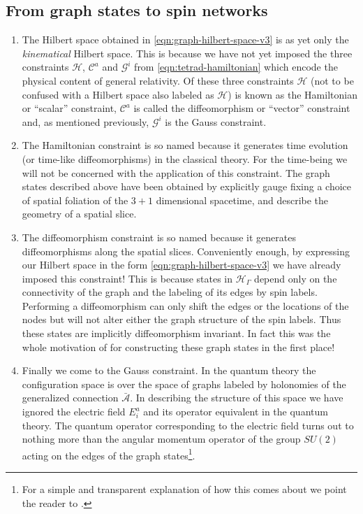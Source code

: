\documentclass[preprint]{SciPost}
\newcommand{\mc}[1]{\mathcal{#1}}
\theoremstyle{plain} %
\begin{document}
\subsection*{From graph states to spin networks}
	\begin{enumerate}[label=\arabic*.]
		\item The Hilbert space obtained in \eqref{eqn:graph-hilbert-space-v3} is as yet only the \emph{kinematical} Hilbert space. This is because we have not yet imposed the three constraints $ \mc{H} $, $ \mc{C}^a $ and $ \mc{G}^i $ from \eqref{eqn:tetrad-hamiltonian} which encode the physical content of general relativity. Of these three constraints $ \mc{H} $ (not to be confused with a Hilbert space also labeled as $ \mc{H} $) is known as the Hamiltonian or ``scalar'' constraint, $ \mc{C}^a $ is called the diffeomorphism or ``vector'' constraint and, as mentioned previously, $ \mc{G}^i $ is the Gauss constraint.
		\item The Hamiltonian constraint is so named because it generates time evolution (or time-like diffeomorphisms) in the classical theory. For the time-being we will not be concerned with the application of this constraint. The graph states described above have been obtained by explicitly gauge fixing a choice of spatial foliation of the $ 3+1 $ dimensional spacetime, and describe the geometry of a spatial slice.
		\item The diffeomorphism constraint is so named because it generates diffeomorphisms along the spatial slices. Conveniently enough, by expressing our Hilbert space in the form \eqref{eqn:graph-hilbert-space-v3} we have already imposed this constraint! This is because states in $ \mc{H}_\Gamma $ depend only on the connectivity of the graph and the labeling of its edges by spin labels. Performing a diffeomorphism can only shift the edges or the locations of the nodes but will not alter either the graph structure of the spin labels. Thus these states are implicitly diffeomorphism invariant. In fact this was the whole motivation of \cite{Ashtekar1994A-Manifestly} for constructing these graph states in the first place!
		\item Finally we come to the Gauss constraint. In the quantum theory the configuration space is over the space of graphs labeled by holonomies of the generalized connection $ \bar{\mc{A}} $. In describing the structure of this space we have ignored the electric field $ E^a_i $ and its operator equivalent in the quantum theory. The quantum operator corresponding to the electric field turns out to nothing more than the angular momentum operator of the group $ SU(2) $ acting on the edges of the graph states\footnote{For a simple and transparent explanation of how this comes about we point the reader to \cite[Sec 6.2]{Vaid2016LQG-for-the-Bewildered}.}.

\end{enumerate}
\end{document}
